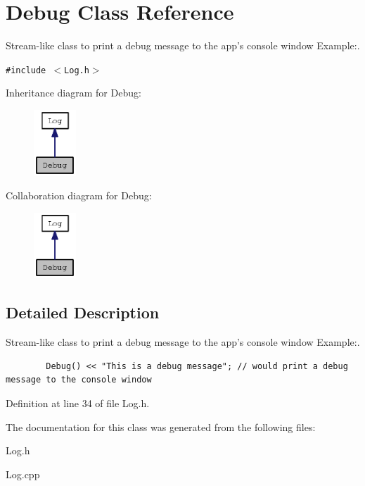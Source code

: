 \section{Debug Class Reference}
\label{classDebug}
Stream-like class to print a debug message to the app's console window Example:.  


{\tt \#include $<$Log.h$>$}

Inheritance diagram for Debug:\nopagebreak
\begin{figure}[H]
\begin{center}
\leavevmode
\includegraphics[width=45pt]{classDebug__inherit__graph}
\end{center}
\end{figure}
Collaboration diagram for Debug:\nopagebreak
\begin{figure}[H]
\begin{center}
\leavevmode
\includegraphics[width=45pt]{classDebug__coll__graph}
\end{center}
\end{figure}


\subsection{Detailed Description}
Stream-like class to print a debug message to the app's console window Example:. 



\begin{Code}\begin{verbatim}        Debug() << "This is a debug message"; // would print a debug message to the console window
\end{verbatim}
\end{Code}

 

Definition at line 34 of file Log.h.

The documentation for this class was generated from the following files:\begin{CompactItemize}
\item 
Log.h\item 
Log.cpp\end{CompactItemize}
